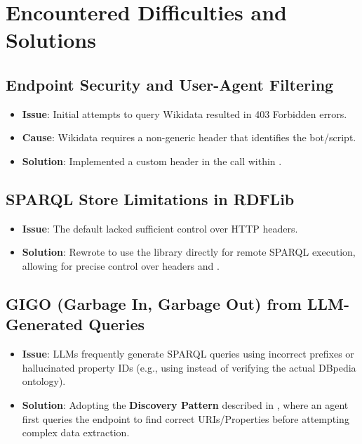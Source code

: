 \section{Encountered Difficulties and Solutions}

\subsection{Endpoint Security and User-Agent Filtering}
\begin{itemize}
    \item \textbf{Issue}: Initial attempts to query Wikidata resulted in 403 Forbidden errors.
    \item \textbf{Cause}: Wikidata requires a non-generic  header that identifies the bot/script.
    \item \textbf{Solution}: Implemented a custom header  in the  call within .
\end{itemize}

\subsection{SPARQL Store Limitations in RDFLib}
\begin{itemize}
    \item \textbf{Issue}: The default  lacked sufficient control over HTTP headers.
    \item \textbf{Solution}: Rewrote  to use the  library directly for remote SPARQL execution, allowing for precise control over  headers and .
\end{itemize}

\subsection{GIGO (Garbage In, Garbage Out) from LLM-Generated Queries}
\begin{itemize}
    \item \textbf{Issue}: LLMs frequently generate SPARQL queries using incorrect prefixes or hallucinated property IDs (e.g., using  instead of verifying the actual DBpedia ontology).
    \item \textbf{Solution}: Adopting the \textbf{Discovery Pattern} described in , where an agent first queries the endpoint to find correct URIs/Properties before attempting complex data extraction.
\end{itemize}

